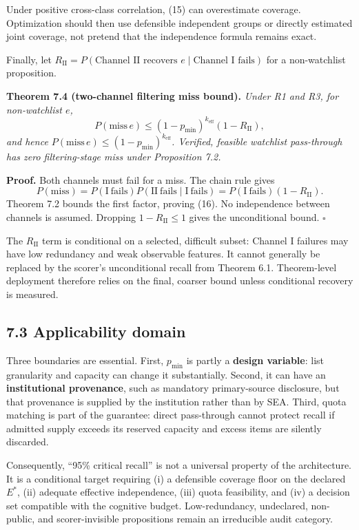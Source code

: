 \documentclass[
  11pt]{article}
\begin{document}
Under positive cross-class correlation, (15) can overestimate coverage. Optimization should then use defensible independent groups or directly estimated joint coverage, not pretend that the independence formula remains exact.

Finally, let \(R_{\mathrm{II}}=P(\text{Channel II recovers }e\mid\text{Channel I fails})\) for a non-watchlist proposition.

\textbf{Theorem 7.4 (two-channel filtering miss bound).} \emph{Under R1 and R3, for non-watchlist \(e\),} \[
P(\mathrm{miss}\,e)\leq(1-p_{\min})^{k_{\mathrm{eff}}}(1-R_{\mathrm{II}}),
\tag{16}
\] \emph{and hence \(P(\mathrm{miss}\,e)\leq(1-p_{\min})^{k_{\mathrm{eff}}}\). Verified, feasible watchlist pass-through has zero filtering-stage miss under Proposition 7.2.}

\textbf{Proof.} Both channels must fail for a miss. The chain rule gives \[
P(\mathrm{miss})=P(\mathrm{I\ fails})P(\mathrm{II\ fails}\mid\mathrm{I\ fails})
=P(\mathrm{I\ fails})(1-R_{\mathrm{II}}).
\] Theorem 7.2 bounds the first factor, proving (16). No independence between channels is assumed. Dropping \(1-R_{\mathrm{II}}\leq1\) gives the unconditional bound. \(\square\)

The \(R_{\mathrm{II}}\) term is conditional on a selected, difficult subset: Channel I failures may have low redundancy and weak observable features. It cannot generally be replaced by the scorer's unconditional recall from Theorem 6.1. Theorem-level deployment therefore relies on the final, coarser bound unless conditional recovery is measured.

\subsection{7.3 Applicability domain}\label{applicability-domain}

Three boundaries are essential. First, \(p_{\min}\) is partly a \textbf{design variable}: list granularity and capacity can change it substantially. Second, it can have an \textbf{institutional provenance}, such as mandatory primary-source disclosure, but that provenance is supplied by the institution rather than by SEA. Third, quota matching is part of the guarantee: direct pass-through cannot protect recall if admitted supply exceeds its reserved capacity and excess items are silently discarded.

Consequently, ``95\% critical recall'' is not a universal property of the architecture. It is a conditional target requiring (i) a defensible coverage floor on the declared \(E^*\), (ii) adequate effective independence, (iii) quota feasibility, and (iv) a decision set compatible with the cognitive budget. Low-redundancy, undeclared, non-public, and scorer-invisible propositions remain an irreducible audit category.
\end{document}
